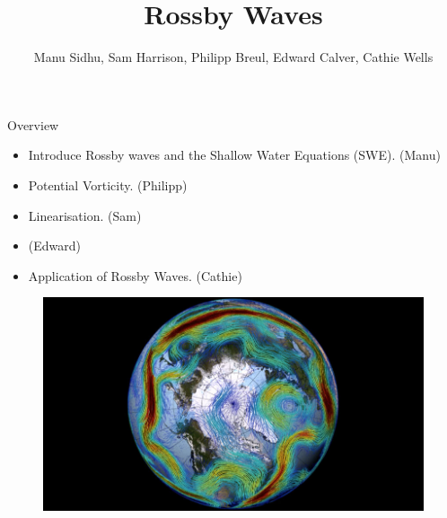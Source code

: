 \documentclass[12pt]{beamer}
\title[Rossby Waves]{Rossby Waves}
\author{Manu Sidhu, Sam Harrison, Philipp Breul, Edward Calver, Cathie Wells}
\institute{University of Reading and Imperial College London}
\begin{document}
\begin{frame}
  \titlepage
\end{frame}

\begin{frame}{Overview}
	
    \begin{itemize}
    	\item Introduce Rossby waves and the Shallow Water Equations (SWE). (Manu)
    	\item Potential Vorticity. (Philipp)
        \item Linearisation. (Sam)
        \item (Edward)
        \item Application of Rossby Waves. (Cathie)
    \end{itemize}
    
    \begin{figure}[H]
	    \centering
	    \includegraphics[width=0.5\linewidth]{Rossby_Wave.jpg}
    \end{figure}   
    
\end{frame}
\end{document}

